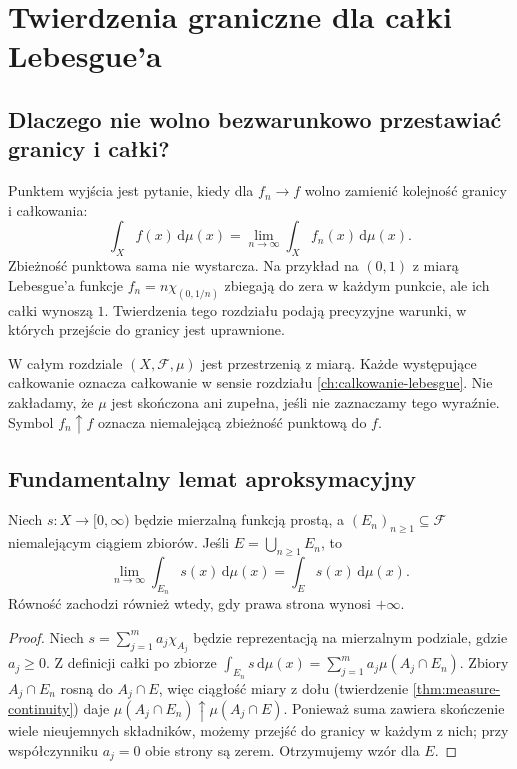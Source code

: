 \chapter{Twierdzenia graniczne dla całki Lebesgue'a}
\label{ch:twierdzenia-graniczne}

\section{Dlaczego nie wolno bezwarunkowo przestawiać granicy i całki?}

Punktem wyjścia jest pytanie, kiedy dla $f_n\to f$ wolno
zamienić kolejność granicy i całkowania:
\[
\int_X f(x)\,\mathrm d\mu(x)
=\lim_{n\to\infty}\int_X f_n(x)\,\mathrm d\mu(x).
\]
Zbieżność punktowa sama nie wystarcza. Na przykład na
$(0,1)$ z miarą Lebesgue'a funkcje
$f_n=n\chi_{(0,1/n)}$ zbiegają do zera w każdym
punkcie, ale ich całki wynoszą $1$.
Twierdzenia tego rozdziału podają precyzyjne warunki,
w których przejście do granicy jest uprawnione.

W całym rozdziale $(X,\mathcal F,\mu)$ jest przestrzenią
z miarą. Każde występujące całkowanie oznacza całkowanie
w sensie rozdziału \ref{ch:calkowanie-lebesgue}.
Nie zakładamy, że $\mu$ jest skończona ani zupełna,
jeśli nie zaznaczamy tego wyraźnie. Symbol $f_n\uparrow f$
oznacza niemalejącą zbieżność punktową do $f$.

\section{Fundamentalny lemat aproksymacyjny}

\begin{lemat}
\label{lem:simple-exhaustion}
Niech $s:X\to[0,\infty)$ będzie mierzalną funkcją
prostą, a $(E_n)_{n\ge1}\subseteq\mathcal F$
niemalejącym ciągiem zbiorów. Jeśli
$E=\bigcup_{n\ge1}E_n$, to
\[
\lim_{n\to\infty}\int_{E_n}s(x)\,\mathrm d\mu(x)
=\int_Es(x)\,\mathrm d\mu(x).
\]
Równość zachodzi również wtedy, gdy prawa strona
wynosi $+\infty$.
\end{lemat}
\begin{proof}
Niech $s=\sum_{j=1}^m a_j\chi_{A_j}$
będzie reprezentacją na mierzalnym podziale, gdzie
$a_j\ge0$. Z definicji całki po zbiorze
$\int_{E_n}s\,\mathrm d\mu(x)=
\sum_{j=1}^m a_j\mu(A_j\cap E_n)$.
Zbiory $A_j\cap E_n$ rosną do $A_j\cap E$, więc
ciągłość miary z dołu (twierdzenie
\ref{thm:measure-continuity}) daje
$\mu(A_j\cap E_n)\uparrow\mu(A_j\cap E)$.
Ponieważ suma zawiera skończenie wiele nieujemnych
składników, możemy przejść do granicy w każdym z nich;
przy współczynniku $a_j=0$ obie strony są zerem.
Otrzymujemy wzór dla $E$.
\end{proof}


